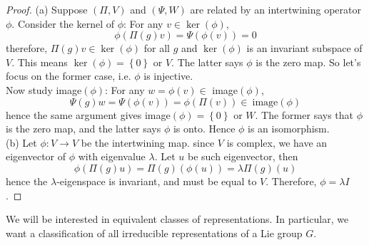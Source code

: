 \documentclass[11pt]{article}
\begin{document}
\begin{proof}
(a) Suppose $(\Pi,V)$ and $(\Psi,W)$ are related by an intertwining operator $\phi$. Consider the kernel of $\phi$: For any $v \in \ker(\phi)$,
$$\phi(\Pi(g)v) = \Psi(\phi(v)) = 0$$
therefore, $\Pi(g)v \in \ker(\phi)$ for all $g$ and  $\ker(\phi)$ is an invariant subspace of $V$. This means $\ker(\phi) = \left\{0\right\}$ or $V$. The latter says $\phi$ is the zero map. So let's focus on the former case, i.e. $\phi$ is injective.\\
Now study image$(\phi)$: For any $w = \phi(v) \in$ image$(\phi)$,
$$\Psi(g)w = \Psi(\phi(v)) = \phi(\Pi(v)) \in\ \text{image}(\phi)$$
hence the same argument gives image$(\phi) = \left\{0\right\}$ or $W$. The former says that $\phi$ is the zero map, and the latter says $\phi$ is onto. Hence $\phi$ is an isomorphism.\\
(b) Let $\phi: V \to V$ be the intertwining map. since $V$ is complex, we have an eigenvector of $\phi$ with eigenvalue $\lambda$. Let $u$ be such eigenvector, then
$$\phi(\Pi(g)u) = \Pi(g)(\phi(u)) = \lambda \Pi(g)(u)$$
hence the $\lambda$-eigenspace is invariant, and must be equal to $V$. Therefore, $\phi = \lambda I$.
\end{proof}



We will be interested in equivalent classes of representations. In particular, we want a classification of all irreducible representations of a Lie group $G$.
\end{document}
